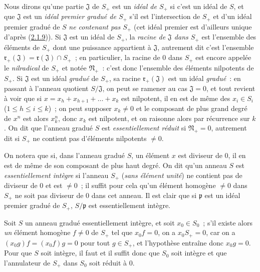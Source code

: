 \begin{env}[2.1.10]
\label{II.2.1.10-fr}
Nous dirons qu'une partie $\mathfrak{J}$ de $S_+$ est un
\emph{idéal de $S_+$} si c'est un idéal de $S$, et que $\mathfrak{J}$ est un
\emph{idéal premier gradué de $S_+$} s'il est l'intersection de $S_+$ et
d'un idéal premier gradué de $S$ \emph{ne contenant pas $S_+$} (cet idéal
premier est d'ailleurs unique d'après
(\hyperref[II.2.1.9-fr]{2.1.9})). Si $\mathfrak{J}$ est un idéal de $S_+$,
la \emph{racine de $\mathfrak{J}$ dans $S_+$} est l'ensemble des éléments de
$S_+$ dont une puissance appartient à $\mathfrak{J}$, autrement dit c'est
l'ensemble $\mathfrak{r}_+(\mathfrak{J})=\mathfrak{r}(\mathfrak{J})\cap S_+$~; en particulier, la
racine de $0$ dans $S_+$ est encore appelée le \emph{nilradical} de $S_+$ et
notée $\mathfrak{N}_+$~: c'est donc l'ensemble des éléments nilpotents de
$S_+$. Si $\mathfrak{J}$ est un idéal \emph{gradué} de $S_+$, sa racine
$\mathfrak{r}_+(\mathfrak{J})$ est un idéal \emph{gradué}~: en passant à l'anneau quotient
$S/\mathfrak{J}$, on peut se ramener au cas $\mathfrak{J}=0$, et tout
revient à voir que si $x=x_h+x_{h+1}+\ldots+x_k$ est nilpotent, il en est de
même des $x_i\in S_i$ ($1\leq h\leq i\leq k$)~; on peut supposer
$x_k\neq 0$ et le composant de plus grand degré de $x^n$ est alors $x_k^n$,
donc $x_k$ est nilpotent, et on raisonne alors par récurrence sur $k$. On dit
que l'anneau gradué $S$ est \emph{essentiellement réduit} si
$\mathfrak{N}_+=0$, autrement dit si $S_+$ ne contient pas d'éléments
nilpotents $\neq 0$.
\end{env}

\begin{env}[2.1.11]
\label{II.2.1.11-fr}
On notera que si, dans l'anneau gradué $S$, un élément $x$ est diviseur de
$0$, il en est de même de son composant de plus haut degré. On dit qu'un
anneau $S$ est \emph{essentiellement intègre} si l'anneau $S_+$
(\emph{sans élément unité}) ne contient pas de diviseur de $0$ et est
$\neq 0$~; il suffit pour cela qu'un élément homogène $\neq 0$ dans $S_+$ ne
soit pas diviseur de $0$ dans cet anneau. Il est clair que si $\mathfrak{p}$
est un idéal premier gradué de $S_+$, $S/\mathfrak{p}$ est essentiellement
intègre.

Soit $S$ un anneau gradué essentiellement intègre, et soit $x_0\in S_0$~;
s'il existe alors \emph{un} élément homogène $f\neq 0$ de $S_+$ tel que
$x_0f=0$, on a $x_0S_+=0$, car on a $(x_0g)f=(x_0f)g=0$ pour tout
$g\in S_+$, et l'hypothèse entraîne donc $x_0g=0$. Pour que $S$ soit
intègre, il faut et il suffit donc que $S_0$ soit intègre et que l'annulateur
de $S_+$ dans $S_0$ soit réduit à $0$.
\end{env}

